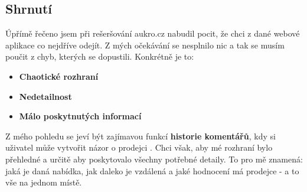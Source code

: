 
\newpage
\subsection{Shrnutí}
Úpřímě řečeno jsem při rešeršování aukro.cz nabudil pocit, že chci z dané webové aplikace co nejdříve odejít. Z mých očekávání se nesplnilo nic a tak se musím poučit z chyb, kterých se dopustili. Konkrétně je to:
\begin{itemize}
    \item \textbf{Chaotické rozhraní}
    \item \textbf{Nedetailnost}
    \item \textbf{Málo poskytnutých informací}
\end{itemize}

Z mého pohledu se jeví být zajímavou funkcí \textbf{historie komentářů}, kdy si uživatel může vytvořit názor o prodejci . Chci však, aby mé rozhraní bylo přehledné a určitě aby poskytovalo všechny potřebné detaily. To pro mě znamená: jaká je daná nabídka, jak daleko je vzdálená a jaké hodnocení má prodejce - a to vše na jednom místě.